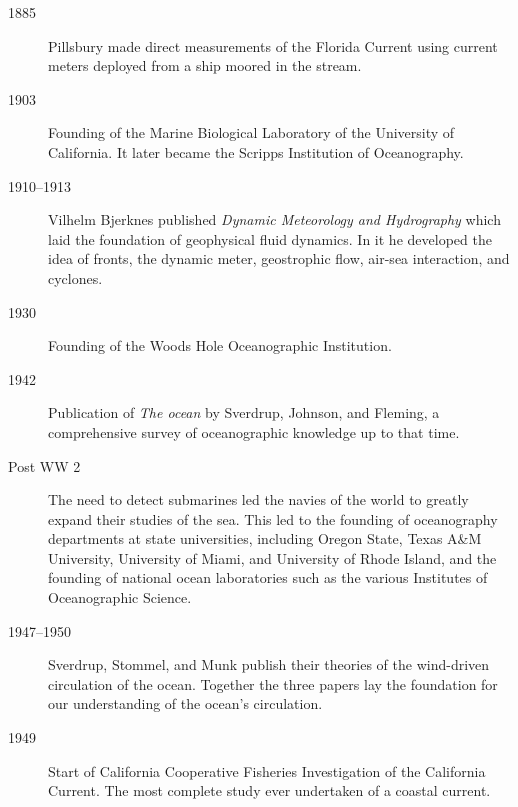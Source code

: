 \begin{description}
\item[1885] Pillsbury made direct measurements of the Florida Current
  using current meters deployed from a ship moored in the
  stream. \vspace{-1.0ex}

\item[1903] Founding of the Marine Biological Laboratory of the
  University of California. It later became the Scripps Institution of
  Oceanography.
\vspace{-1.0ex}

\item[1910--1913] Vilhelm Bjerknes published \textit{Dynamic
  Meteorology and Hydrography} which laid the foundation of
  geophysical fluid dynamics. In it he developed the idea of fronts,
  the dynamic meter, geostrophic flow,
  air-sea interaction, and cyclones. \vspace{-1.0ex}

\item[1930] Founding of the Woods Hole Oceanographic Institution.
\vspace{-1.0ex} 

\item[1942] Publication of \textit{The ocean} by Sverdrup, Johnson,
  and Fleming, a comprehensive survey of oceanographic knowledge up to
  that time. \vspace{-1.0ex}

\item[Post WW 2] The need to detect submarines led the navies of the
  world to greatly expand their studies of the sea. This led to the
  founding of oceanography departments at state universities,
  including Oregon State, Texas A\&M University, University of Miami,
  and University of Rhode Island, and the founding of national ocean
  laboratories such as the various Institutes of Oceanographic
  Science. \vspace{-1.0ex}

\item[1947--1950] Sverdrup, Stommel, and Munk publish their theories
  of the wind-driven circulation of the ocean. Together the three
  papers lay the foundation for our understanding of the ocean's
  circulation. \vspace{-1.0ex}

\item[1949] Start of California Cooperative Fisheries Investigation of
  the California Current. The most complete study ever undertaken of a
  coastal current. \vspace{-1.0ex}


\end{description}
